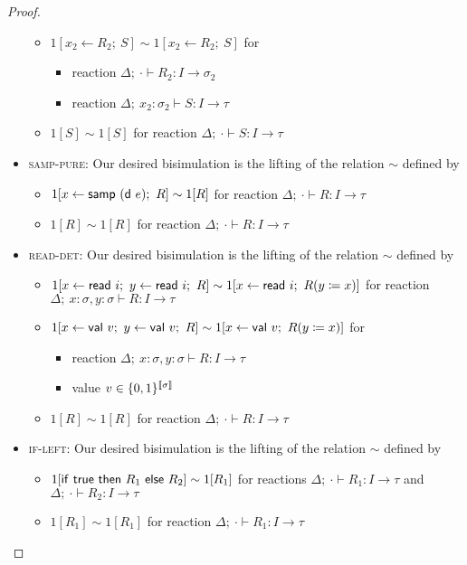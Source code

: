 \begin{proof}
\begin{itemize}
\begin{itemize}
\begin{itemize}
\end{itemize}
\item $1[x_2 \leftarrow R_2; \ S] \sim 1[x_2 \leftarrow R_2; \ S]$ for
\begin{itemize}
\item reaction $\Delta; \ \cdot \vdash R_2 : I \to \sigma_2$
\item reaction $\Delta; \ x_2 : \sigma_2 \vdash S : I \to \tau$
\end{itemize}
\item $1[S] \sim 1[S]$ for reaction $\Delta; \ \cdot \vdash S : I \to \tau$
\end{itemize}
\item \textsc{samp-pure}: Our desired bisimulation is the lifting of the relation $\sim$ defined by
\begin{itemize}
\item $1[x \leftarrow \samp{(\dist \ e)}; \ R] \sim 1[R]$ for reaction $\Delta; \ \cdot \vdash R : I \to \tau$
\item $1[R] \sim 1[R]$ for reaction $\Delta; \ \cdot \vdash R : I \to \tau$
\end{itemize}
\item \textsc{read-det}: Our desired bisimulation is the lifting of the relation $\sim$ defined by
\begin{itemize}
\item $1[x \leftarrow \mathsf{read} \ i; \ y \leftarrow \mathsf{read} \ i; \ R] \sim 1[x \leftarrow \mathsf{read} \ i; \ R(y \coloneqq x)]$ for reaction $\Delta; \ x : \sigma, y : \sigma \vdash R : I \to \tau$
\item $1[x \leftarrow \mathsf{val} \ v; \ y \leftarrow \mathsf{val} \ v; \ R] \sim 1[x \leftarrow \mathsf{val} \ v; \ R(y \coloneqq x)]$ for
\begin{itemize}
\item reaction $\Delta; \ x : \sigma, y : \sigma \vdash R : I \to \tau$ 
\item value $v \in \{0,1\}^{\llbracket \sigma \rrbracket}$
\end{itemize}
\item $1[R] \sim 1[R]$ for reaction $\Delta; \ \cdot \vdash R : I \to \tau$
\end{itemize}
\item \textsc{if-left}: Our desired bisimulation is the lifting of the relation $\sim$ defined by
\begin{itemize}
\item $1[\mathsf{if} \ \mathsf{true} \ \mathsf{then} \ R_1 \ \mathsf{else} \ R_2] \sim 1[R_1]$ for reactions $\Delta; \ \cdot \vdash R_1 : I \to \tau$ and $\Delta; \ \cdot \vdash R_2 : I \to \tau$
\item $1[R_1] \sim 1[R_1]$ for reaction $\Delta; \ \cdot \vdash R_1 : I \to \tau$

\end{itemize}
\end{itemize}
\end{proof}
